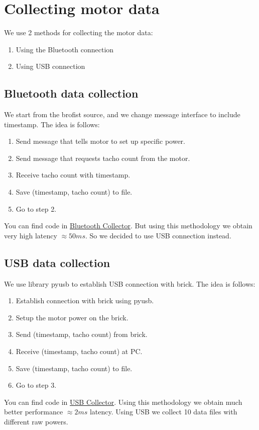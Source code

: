 \documentclass[a4paper,12pt,oneside]{article}
\begin{document}
\section{Collecting motor data}
We use 2 methods for collecting the motor data:
\begin{enumerate}
\item Using the Bluetooth connection
\item Using USB connection
\end{enumerate}

\subsection{Bluetooth data collection}
We start from the brofist source, and we change message interface to include timestamp. The idea is follows:
\begin{enumerate}
\item Send message that tells motor to set up specific power.
\item Send message that requests tacho count from the motor.
\item Receive tacho count with timestamp.
\item Save (timestamp, tacho count) to file.
\item Go to step 2.
\end{enumerate}
You can find code in \href{https://github.com/AliaksandrSiarohin/AppliedRobotics/tree/master/brofist}{Bluetooth Collector}. But using this methodology we obtain very high latency $\approx 50ms$. So we decided to use USB connection instead.

\subsection{USB data collection}
We use library pyusb to establish USB connection with brick. The idea is follows:
\begin{enumerate}
\item Establish connection with brick using pyusb.
\item Setup the motor power on the brick.
\item Send (timestamp,  tacho count) from brick.
\item Receive (timestamp,  tacho count)  at PC.
\item Save (timestamp,  tacho count) to file.
\item Go to step 3.
\end{enumerate}
You can find code in \href{https://github.com/AliaksandrSiarohin/AppliedRobotics/tree/master/usb_collector}{USB Collector}. Using this methodology we obtain much better performance $\approx 2ms$ latency. Using USB we collect 10 data files with different raw powers.
\end{document}
